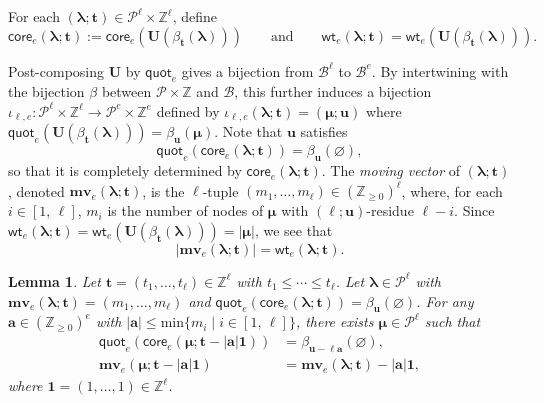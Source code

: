 \documentclass[11pt,a4paper,reqno]{amsart}
\numberwithin{equation}{section}
\theoremstyle{plain}
\newtheorem{lem}[thm]{Lemma}
\theoremstyle{definition}
\theoremstyle{remark}
\numberwithin{equation}{section}
\newcommand{\bone}{\boldsymbol{1}}
\newcommand{\bl}{\boldsymbol{\lambda}}
\newcommand{\bm}{\boldsymbol{\mu}}
\newcommand{\UU}{\mathbf{U}}
\newcommand{\ba}{\mathbf{a}}
\newcommand{\bt}{\mathbf{t}}
\newcommand{\bu}{\mathbf{u}}
\newcommand{\wt}{\mathsf{wt}}
\newcommand{\core}{\mathsf{core}}
\newcommand{\quot}{\mathsf{quot}}
\newcommand{\mv}{\mathbf{mv}}
\renewcommand{\min}{\mathrm{min}}
\newcommand{\ZZ}{\mathbb{Z}}
\newcommand{\BB}{\mathcal{B}}
\newcommand{\PP}{\mathcal{P}}
\newcommand{\bij}{\iota}
\newcommand{\EP}{\pmb{\varnothing}}
\begin{document}
For each $(\bl;\bt) \in \PP^{\ell} \times \ZZ^{\ell}$, define
$$
\core_e(\bl;\bt) := \core_e(\UU(\beta_{\bt}(\bl))) \qquad \text{and} \qquad
\wt_e(\bl;\bt) = \wt_e(\UU(\beta_{\bt}(\bl))).
$$


Post-composing $\UU$ by $\quot_e$ gives a bijection from $\BB^{\ell}$ to $\BB^{e}$.
By intertwining with the bijection $\beta$ between $\PP \times \ZZ$ and $\BB$, this further induces a bijection $\bij_{\ell,e} : \PP^{\ell} \times \ZZ^{\ell} \to \PP^e \times \ZZ^e$ defined by $\bij_{\ell,e}(\bl;\bt) = (\bm;\bu)$ where $\quot_e(\UU(\beta_{\bt}(\bl))) = \beta_{\bu}(\bm)$.  %
Note that %
$\bu$ satisfies
\begin{equation} \label{E:bu}
\quot_e(\core_e(\bl;\bt)) = \beta_{\bu}(\EP),
\end{equation}
so that it is completely determined by $\core_e(\bl;\bt)$.
The {\em moving vector} of $(\bl;\bt)$, denoted $\mv_e(\bl;\bt)$, is the $\ell$-tuple $(m_1,\dotsc, m_{\ell}) \in (\ZZ_{\geq 0})^{\ell}$, where, for each $i \in [1,\,\ell]$, $m_i$ is the number of nodes of $\bm$ with $(\ell;\bu)$-residue $\ell-i$.
Since $\wt_e(\bl;\bt) = \wt_e(\UU(\beta_{\bt}(\bl))) = |\bm|$, we see that \begin{equation}
|\mv_e(\bl;\bt)| = \wt_e(\bl;\bt). \label{E:wt-mv}
\end{equation}


\begin{lem} \label{L:-}
Let $\bt = (t_1,\dotsc, t_{\ell}) \in \ZZ^{\ell}$ with $t_1 \leq \dotsb \leq t_{\ell}$. 
Let $\bl \in \PP^{\ell}$ with $\mv_e(\bl;\bt) = (m_1,\dotsc, m_{\ell})$
and $\quot_e(\core_e(\bl;\bt)) = \beta_{\bu}(\EP)$.  
For any $\ba \in (\ZZ_{\geq 0})^e$ with $|\ba| \leq \min\{ m_i \mid i \in [1,\, \ell] \}$,
there exists $\bm \in \PP^{\ell}$ such that 
\begin{align*}
\quot_e(\core_e(\bm;\bt- |\ba|\bone)) &= \beta_{\bu - \ell\ba} (\EP), \\
\mv_e(\bm;\bt-|\ba|\bone) &= \mv_e(\bl;\bt) - |\ba|\bone, 
\end{align*}
where $\bone = (1,\dotsc, 1) \in \ZZ^{\ell}$.
\end{lem}
\end{document}
